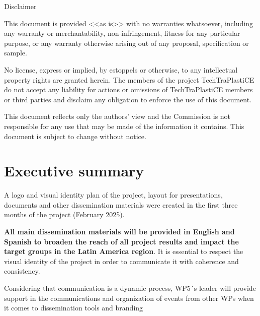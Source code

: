 \documentclass[
  12pt,
  oneside]{book}
\renewcommand*\contentsname{Table of contents}
\newcommand\contentsname{Table of contents}
\begin{document}
\begin{frontmatter}
\begin{titlepage}
    {\scriptsize\centering\color{lightgray} 
    
    Disclaimer
    
    This document is provided <<as is>> with no warranties whatsoever, 
    including any warranty or merchantability, non-infringement, fitness for any particular 
    purpose, or any warranty otherwise arising out of any proposal, specification or sample.  
    
    No license, express or implied, by estoppels or otherwise, to any intellectual 
    property rights are granted herein. 
    The members of the project TechTraPlastiCE do not accept any liability for actions or 
    omissions of TechTraPlastiCE members or third parties and disclaim any obligation 
    to enforce the use of this document. 
    
    This document reflects only the authors' view and the Commission is not responsible 
    for any use that may be made of the information it contains.  
    This document is subject to change without notice. 
    
    }
    \normalsize
    
    
    
      \end{titlepage}
  \end{frontmatter}

\renewcommand*\contentsname{Contents}
{
\setcounter{tocdepth}{2}
\tableofcontents
}

\mainmatter
\chapter{Executive summary}\label{executive-summary}

A logo and visual identity plan of the project, layout for
presentations, documents and other dissemination materials were created
in the first three months of the project (February 2025).

\textbf{All main dissemination materials will be provided in English and
Spanish to broaden the reach of all project results and impact the
target groups in the Latin America region}. It is essential to respect
the visual identity of the project in order to communicate it with
coherence and consistency.

Considering that communication is a dynamic process, WP5´s leader will
provide support in the communications and organization of events from
other WPs when it comes to dissemination tools and branding
\end{document}
